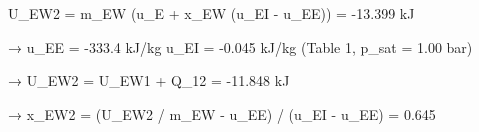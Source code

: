 U_EW2 = m_EW (u_E + x_EW (u_EI - u_EE)) = -13.399 kJ  

→ u_EE = -333.4 kJ/kg  
u_EI = -0.045 kJ/kg  
(Table 1, p_sat = 1.00 bar)  

→ U_EW2 = U_EW1 + Q_12 = -11.848 kJ  

→ x_EW2 = (U_EW2 / m_EW - u_EE) / (u_EI - u_EE) = 0.645